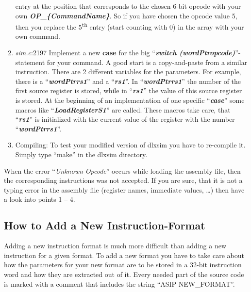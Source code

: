 \begin{enumerate}
  entry at the position that corresponds to the chosen 6-bit opcode with
  your own \emph{\textbf{OP\_\{CommandName\}}}. So if you have chosen
  the opcode value 5, then you replace the 5\textsuperscript{th} entry
  (start counting with 0) in the array with your own command.
\item
  \emph{sim.c}:2197 Implement a new \textbf{case} for the big
  ``\emph{\textbf{switch (wordPtropcode)}}''-statement for your command.
  A good start is a copy-and-paste from a similar instruction. There are
  2 different variables for the parameters. For example, there is a
  ``\emph{\textbf{wordPtrrs1}}'' and a ``\emph{\textbf{rs1}}''. In
  ``\emph{\textbf{wordPtrrs1}}'' the number of the first source register
  is stored, while in ``\emph{\textbf{rs1}}'' the value of this source
  register is stored. At the beginning of an implementation of one
  specific ``\emph{\textbf{case}}'' some macros like
  ``\emph{\textbf{LoadRegisterS1}}'' are called. These macros take care,
  that ``\emph{\textbf{rs1}}'' is initialized with the current value of
  the register with the number ``\emph{\textbf{wordPtrrs1}}''.
\item
  Compiling: To test your modified version of dlxsim you have to
  re-compile it. Simply type ``make'' in the dlxsim directory.
\end{enumerate}
When the error ``\emph{Unknown Opcode}'' occurs while loading the
assembly file, then the corresponding instructions was not accepted. If
you are sure, that it is not a typing error in the assembly file
(register names, immediate values, \ldots) then have a look into points
1 -- 4.
\hypertarget{how-to-add-a-new-instruction-format}{%
\subsection{How to Add a New
Instruction-Format}\label{how-to-add-a-new-instruction-format}}
Adding a new instruction format is much more difficult than adding a new
instruction for a given format. To add a new format you have to take
care about how the parameters for your new format are to be stored in a
32-bit instruction word and how they are extracted out of it. Every
needed part of the source code is marked with a comment that includes
the string ``ASIP NEW\_FORMAT''.
